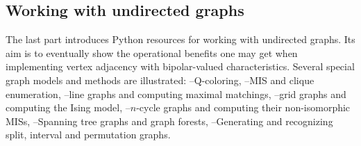 % 
%
%

\begin{partbacktext}
\part{Working with undirected graphs}
\noindent The last part introduces Python resources for working with undirected graphs. Its aim is to eventually show the operational benefits one may get when implementing vertex adjacency with bipolar-valued characteristics. Several special graph models and methods are illustrated: --Q-coloring, --MIS and clique enumeration, --line graphs and computing maximal matchings, --grid graphs and computing the Ising model, --$n$-cycle graphs and computing their non-isomorphic MISs, --Spanning tree graphs and graph forests, --Generating and recognizing split, interval and permutation graphs.
\end{partbacktext}